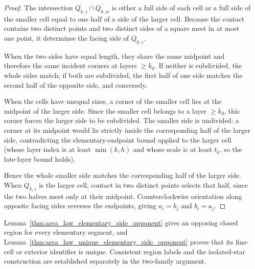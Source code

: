 \begin{proof}\leanok
    The intersection $\overline{Q_{k,z}}\cap\overline{Q_{h,w}}$ is either
    a full side of each cell or a full side of the smaller cell equal to
    one half of a side of the larger cell. Because the contact contains
    two distinct points and two distinct sides of a square meet in at most
    one point, it determines the facing side of $Q_{k,z}$.

    When the two sides have equal length, they share the same midpoint
    and therefore the same incident corners at layers $\ge k_0$. If
    neither is subdivided, the whole sides match; if both are subdivided,
    the first half of one side matches the second half of the opposite
    side, and conversely.

    When the cells have unequal sizes, a corner of the smaller cell lies
    at the midpoint of the larger side. Since the smaller cell belongs to
    a layer $\ge k_0$, this corner forces the larger side to be subdivided.
    The smaller side is undivided: a corner at its midpoint would lie
    strictly inside the corresponding half of the larger side,
    contradicting the elementary-endpoint bound
    applied to the larger cell (whose layer index is at least $\min(k,h)$
    and whose scale is at least $t_k$, so the late-layer bound holds).

    Hence the whole smaller side matches the corresponding half of the
    larger side. When $Q_{k,z}$ is the larger cell, contact in two
    distinct points selects that half, since the two halves meet only at
    their midpoint. Counterclockwise orientation along opposite facing
    sides reverses the endpoints, giving $a_i=b_j$ and $b_i=a_j$.
\end{proof}

Lemma~\ref{thm:area_law_elementary_side_opponent} gives an opposing
closed region for every elementary segment, and
Lemma~\ref{thm:area_law_unique_elementary_side_opponent} proves that its
fine-cell or exterior identifier is unique. Consistent region labels
and the isolated-star construction are established separately in the
two-family argument.
